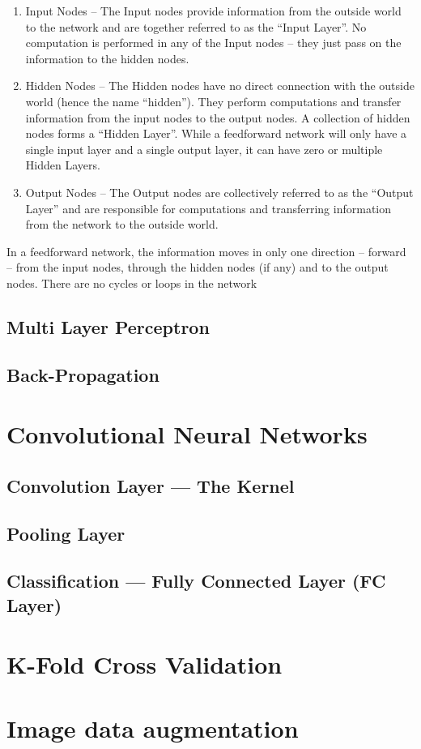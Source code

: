 \begin{enumerate}
\item Input Nodes – The Input nodes provide information from the outside world to the network and are   together referred to as the “Input Layer”. No computation is performed in any of the Input nodes – they just pass on the information to the hidden nodes.
\item Hidden Nodes – The Hidden nodes have no direct connection with the outside world (hence the name “hidden”). They perform computations and transfer information from the input nodes to the output nodes. A collection of hidden nodes forms a “Hidden Layer”. While a feedforward network will only have a single input layer and a single output layer, it can have zero or multiple Hidden Layers.
\item Output Nodes – The Output nodes are collectively referred to as the “Output Layer” and are responsible for computations and transferring information from the network to the outside world.
\end{enumerate}

In a feedforward network, the information moves in only one direction – forward – from the input nodes, through the hidden nodes (if any) and to the output nodes. There are no cycles or loops in the network


\subsection{Multi Layer Perceptron}
\subsection{Back-Propagation}




\section{Convolutional Neural Networks}
\subsection{Convolution Layer — The Kernel}
\subsection{Pooling Layer}
\subsection{Classification — Fully Connected Layer (FC Layer)}
\section{K-Fold Cross Validation}
\section{Image data augmentation}



